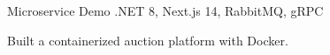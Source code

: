 \resumeProject
  {Microservice Demo}
  {.NET 8, Next.js 14, RabbitMQ, gRPC}
  {
    \item Built a containerized auction platform with Docker.
  }
